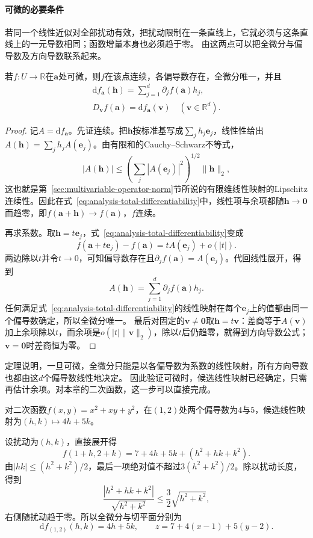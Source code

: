 \paragraph{可微的必要条件}
若同一个线性近似对全部扰动有效，把扰动限制在一条直线上，它就必须与这条直线上的一元导数相同；函数增量本身也必须趋于零。
由这两点可以把全微分与偏导数及方向导数联系起来。
\begin{theorem}
\label{thm:multivariable-differentiable-necessary}
若$f:U\to\mathbb R$在$\bm a$处可微，则$f$在该点连续，各偏导数存在，全微分唯一，并且
\begin{equation}
 \begin{gathered}
\mathrm df_{\bm a}(\bm h)=\sum_{j=1}^d\partial_jf(\bm a)h_j,\\
D_{\bm v}f(\bm a)=\mathrm df_{\bm a}(\bm v)
 \quad(\bm v\in\mathbb R^d).
 \end{gathered}
\label{eq:multivariable-differential-partials}
\end{equation}
\end{theorem}
\begin{proof}
记$A=\mathrm df_{\bm a}$。先证连续。把$\bm h$按标准基写成$\sum_jh_j\bm e_j$，线性性给出$A(\bm h)=\sum_jh_jA(\bm e_j)$。由有限和的Cauchy--Schwarz不等式，
\[
 |A(\bm h)|\leq\left(\sum_j|A(\bm e_j)|^2\right)^{1/2}\lVert\bm h\rVert_2,
\]
这也就是第~\ref{sec:multivariable-operator-norm}节所说的有限维线性映射的Lipschitz连续性。因此在式~\eqref{eq:analysis-total-differentiability}中，线性项与余项都随$\bm h\to\bm 0$而趋零，即$f(\bm a+\bm h)\to f(\bm a)$，$f$连续。

再求系数。取$\bm h=t\bm e_j$，式~\eqref{eq:analysis-total-differentiability}变成
\[
 f(\bm a+t\bm e_j)-f(\bm a)=tA(\bm e_j)+o(|t|).
\]
两边除以$t$并令$t\to0$，可知偏导数存在且$\partial_jf(\bm a)=A(\bm e_j)$。代回线性展开，得到
\[
 A(\bm h)=\sum_{j=1}^d\partial_jf(\bm a)h_j.
\]
任何满足式~\eqref{eq:analysis-total-differentiability}的线性映射在每个$\bm e_j$上的值都由同一个偏导数确定，所以全微分唯一。
最后对固定的$\bm v\neq\bm0$取$\bm h=t\bm v$：差商等于$A(\bm v)$加上余项除以$t$，而余项是$o(|t|\lVert\bm v\rVert_2)$，除以$t$后仍趋零，就得到方向导数公式；$\bm v=\bm0$时差商恒为零。
\end{proof}
定理说明，一旦可微，全微分只能是以各偏导数为系数的线性映射，所有方向导数也都由这$d$个偏导数线性地决定。
因此验证可微时，候选线性映射已经确定，只需再估计余项。对本章的二次函数，这一步可以直接完成。
\begin{example}[二元二次函数的全微分]
\label{ex:multivariable-quadratic-differential}
对二次函数$f(x,y)=x^2+xy+y^2$，在$(1,2)$处两个偏导数为$4$与$5$，候选线性映射为$(h,k)\mapsto4h+5k$。

设扰动为$(h,k)$，直接展开得
\[
 f(1+h,2+k)=7+4h+5k+(h^2+hk+k^2).
\]
由$|hk|\leq(h^2+k^2)/2$，最后一项绝对值不超过$3(h^2+k^2)/2$。除以扰动长度，得到
\[
 \frac{|h^2+hk+k^2|}{\sqrt{h^2+k^2}}\leq\frac32\sqrt{h^2+k^2},
\]
右侧随扰动趋于零。所以全微分与切平面分别为
\[
 \mathrm df_{(1,2)}(h,k)=4h+5k,\qquad z=7+4(x-1)+5(y-2).
\]
\end{example}

